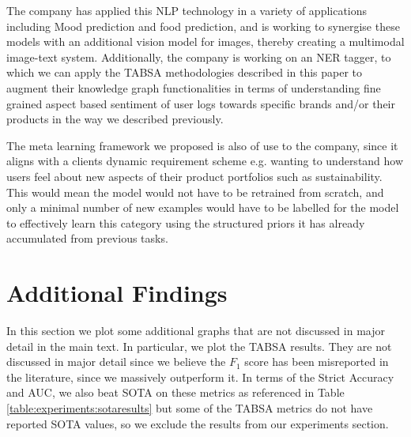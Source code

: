 \documentclass[11pt]{report}
\theoremstyle{Definition}
\theoremstyle{remark}
\begin{document}
The company has applied this NLP technology in a variety of applications including Mood prediction and food prediction, and is working to synergise these models with an additional vision model for images, thereby creating a multimodal image-text system. Additionally, the company is working on an NER tagger, to which we can apply the TABSA methodologies described in this paper to augment their knowledge graph functionalities in terms of understanding fine grained aspect based sentiment of user logs towards specific brands and/or their products in the way we described previously.

The meta learning framework we proposed is also of use to the company, since it aligns with a clients dynamic requirement scheme e.g. wanting to understand how users feel about new aspects of their product portfolios such as sustainability. This would mean the model would not have to be retrained from scratch, and only a minimal number of new examples would have to be labelled for the model to effectively learn this category using the structured priors it has already accumulated from previous tasks.

\chapter{Additional Findings} \label{appendix:additionalfindings}
In this section we plot some additional graphs that are not discussed in major detail in the main text. In particular, we plot the TABSA results. They are not discussed in major detail since we believe the $F_1$ score has been misreported in the literature, since we massively outperform it. In terms of the Strict Accuracy and AUC, we also beat SOTA on these metrics as referenced in Table \ref{table:experiments:sotaresults} but some of the TABSA metrics do not have reported SOTA values, so we exclude the results from our experiments section.
\end{document}
